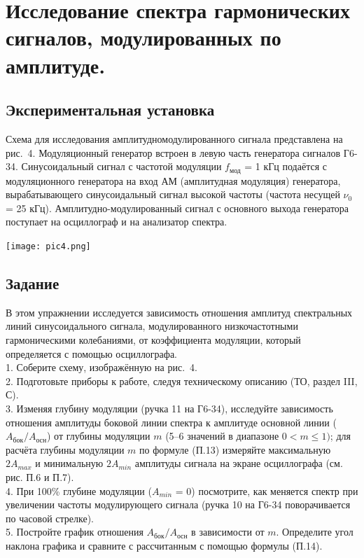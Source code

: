 \section{\label{sec:level1}Исследование спектра
гармонических сигналов,
модулированных по амплитуде.}

\subsection{\label{sec:level2}Экспериментальная установка}

Схема для исследования амплитудномодулированного сигнала представлена на рис.~4. Модуляционный генератор встроен в левую часть генератора сигналов Г6-34. Синусоидальный сигнал с частотой модуляции $f_{\text{мод}}$ = 1 кГц подаётся с модуляционного генератора на вход АМ (амплитудная модуляция) генератора, вырабатывающего синусоидальный сигнал высокой частоты (частота несущей
$\nu_0$ = 25 кГц). Амплитудно-модулированный сигнал с основного выхода генератора поступает на осциллограф и на анализатор спектра.

\texttt{[image: pic4.png]}

\subsection{\label{sec:level2}Задание}

В этом упражнении исследуется зависимость отношения амплитуд
спектральных линий синусоидального сигнала, модулированного низкочастотными гармоническими
колебаниями, от коэффициента модуляции, который определяется с помощью осциллографа.\\
1. Соберите схему, изображённую на рис.~4.\\
2. Подготовьте приборы к работе, следуя техническому описанию (ТО, раздел III, С).\\
3. Изменяя глубину модуляции (ручка 11 на Г6-34), исследуйте зависимость отношения амплитуды боковой линии спектра к амплитуде основной линии ($A_{\text{бок}}/A_{\text{осн}}$) от глубины модуляции $m$ (5–6 значений в диапазоне $0 < m \leqslant 1)$; для расчёта глубины модуляции $m$ по формуле (П.13) измеряйте максимальную $2A_{max}$ и минимальную $2A_{min}$ амплитуды сигнала на экране осциллографа (см. рис. П.6 и П.7).\\
4. При 100\% глубине модуляции ($A_{min}$ = 0) посмотрите, как меняется спектр при увеличении частоты модулирующего сигнала (ручка 10 на Г6-34 поворачивается по часовой стрелке).\\
5. Постройте график отношения $A_{\text{бок}}/A_{\text{осн}}$ в зависимости от $m$. Определите угол наклона графика и сравните с рассчитанным с помощью формулы (П.14).

